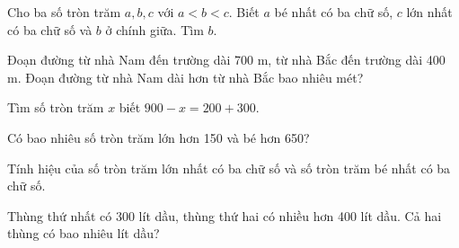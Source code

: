 \begin{ex} %
Cho ba số tròn trăm $a, b, c$ với $a < b < c$. Biết $a$ bé nhất có ba chữ số, $c$ lớn nhất có ba chữ số và $b$ ở chính giữa. Tìm $b$.
\end{ex}

\begin{ex} %
Đoạn đường từ nhà Nam đến trường dài 700 m, từ nhà Bắc đến trường dài 400 m. Đoạn đường từ nhà Nam dài hơn từ nhà Bắc bao nhiêu mét?
\end{ex}

\begin{ex} %
Tìm số tròn trăm $x$ biết $900 - x = 200 + 300$.
\end{ex}

\begin{ex} %
Có bao nhiêu số tròn trăm lớn hơn 150 và bé hơn 650?
\end{ex}

\begin{ex} %
Tính hiệu của số tròn trăm lớn nhất có ba chữ số và số tròn trăm bé nhất có ba chữ số.
\end{ex}

\begin{ex} %
Thùng thứ nhất có 300 lít dầu, thùng thứ hai có nhiều hơn 400 lít dầu. Cả hai thùng có bao nhiêu lít dầu?
\end{ex}
